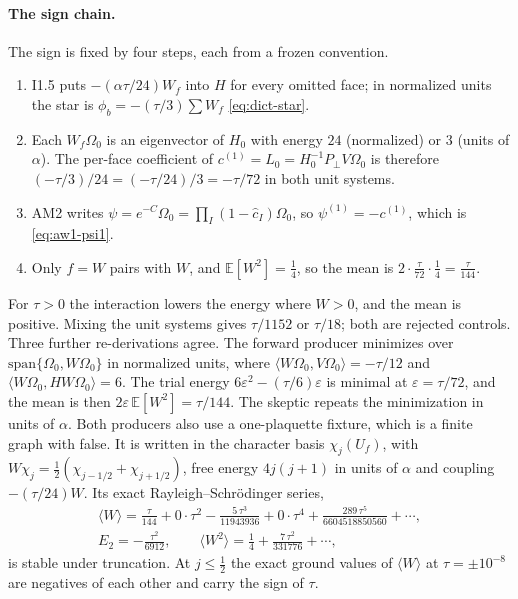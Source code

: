 \paragraph{The sign chain.}
The sign is fixed by four steps, each from a frozen convention.
\begin{enumerate}[label=(\roman*)]
\item I1.5 puts $-(\alpha\tau/24)W_f$ into $H$ for every omitted face; in
normalized units the star is $\phi_b=-(\tau/3)\sum W_f$
\eqref{eq:dict-star}.
\item Each $W_f\Omega_0$ is an eigenvector of $H_0$ with energy $24$
(normalized) or $3$ (units of $\alpha$). The per-face coefficient of
$c^{(1)}=L_0=H_0^{-1}P_\perp V\Omega_0$ is therefore
$(-\tau/3)/24=(-\tau/24)/3=-\tau/72$ in both unit systems.
\item AM2 writes $\psi=e^{-C}\Omega_0=\prod_I(1-\hat c_I)\Omega_0$, so
$\psi^{(1)}=-c^{(1)}$, which is \eqref{eq:aw1-psi1}.
\item Only $f=W$ pairs with $W$, and $\mathbb E[W^2]=\tfrac14$, so the mean is
$2\cdot\tfrac{\tau}{72}\cdot\tfrac14=\tfrac{\tau}{144}$.
\end{enumerate}
For $\tau>0$ the interaction lowers the energy where $W>0$, and the mean is
positive. Mixing the unit systems gives $\tau/1152$ or $\tau/18$; both are
rejected controls. Three further re-derivations agree. The forward producer
minimizes over $\mathrm{span}\{\Omega_0,W\Omega_0\}$ in normalized units,
where $\langle W\Omega_0,V\Omega_0\rangle=-\tau/12$ and
$\langle W\Omega_0,HW\Omega_0\rangle=6$. The trial energy
$6\varepsilon^2-(\tau/6)\varepsilon$ is minimal at $\varepsilon=\tau/72$, and
the mean is then $2\varepsilon\,\mathbb E[W^2]=\tau/144$. The skeptic repeats
the minimization in units of $\alpha$. Both producers also use a
one-plaquette fixture, which is a finite graph with
 false. It is written in the character basis
$\chi_j(U_f)$, with $W\chi_j=\tfrac12(\chi_{j-1/2}+\chi_{j+1/2})$, free
energy $4j(j+1)$ in units of $\alpha$ and coupling $-(\tau/24)W$. Its exact
Rayleigh--Schr\"odinger series,
\begin{equation}
 \begin{gathered}
 \langle W\rangle=\frac{\tau}{144}+0\cdot\tau^2-\frac{5\,\tau^3}{11943936}+0\cdot\tau^4
 +\frac{289\,\tau^5}{6604518850560}+\cdots,\\
 E_2=-\frac{\tau^2}{6912},\qquad
 \langle W^2\rangle=\frac14+\frac{7\,\tau^2}{331776}+\cdots,
 \end{gathered}
 \label{eq:aw1-plaquette}
\end{equation}
is stable under truncation. At $j\le\tfrac12$ the exact ground values of
$\langle W\rangle$ at $\tau=\pm10^{-8}$ are negatives of each other and carry
the sign of $\tau$.

